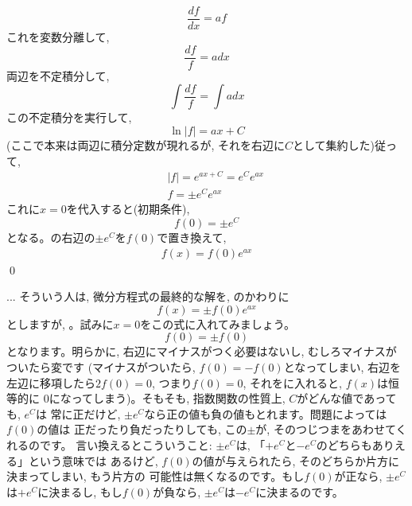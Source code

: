 \begin{equation}\frac{df}{dx}=a f\end{equation}
これを変数分離して, 
\begin{equation}\frac{df}{f}=a dx\end{equation}
両辺を不定積分して, 
\begin{equation}\int\frac {df}{f} = \int a dx\end{equation}
この不定積分を実行して, 
\begin{equation}\ln |f| = a x + C\end{equation}
(ここで本来は両辺に積分定数が現れるが, それを右辺に$C$として集約した)従って, 
\begin{eqnarray}
&&|f| = e^{a x + C} = e^C e^{a x}\\
&&f = \pm e^C e^{a x}\label{eq:1o_diffeq7}
\end{eqnarray}
これに$x=0$を代入すると(初期条件), 
\begin{equation}f(0) = \pm e^C\label{eq:1o_diffeq8}\end{equation}
となる。の右辺の$\pm e^C$を$f(0)$で置き換えて, 
\begin{eqnarray}
f(x)=f(0) e^{a x}\label{eq:1o_diffeq9}
\end{eqnarray}
\qed

\begin{freqmiss}{\small{} ... そういう人は, 微分方程式の最終的な解を, のかわりに
\begin{equation}f(x)=\pm f(0) e^{a x}\label{eq:diff_eq_pm_wrong}\end{equation}
としますが, 。試みに$x=0$をこの式に入れてみましょう。
\begin{equation}f(0)=\pm f(0)\label{eq:diffeq_initcond_pm}\end{equation}
となります。明らかに, 右辺にマイナスがつく必要はないし, むしろマイナスがついたら変です
(マイナスがついたら, $f(0)=-f(0)$となってしまい, 右辺を左辺に移項したら$2f(0)=0$, 
つまり$f(0)=0$, それをに入れると, $f(x)$は恒等的に
0になってしまう)。そもそも, 指数関数の性質上, $C$がどんな値であっても, $e^C$は
常に正だけど, $\pm e^C$なら正の値も負の値もとれます。問題によっては$f(0)$の値は
正だったり負だったりしても, この$\pm$が, そのつじつまをあわせてくれるのです。
言い換えるとこういうこと: $\pm e^C$は, 「$+e^C$と$-e^C$のどちらもありえる」という意味では
あるけど, $f(0)$の値が与えられたら, そのどちらか片方に決まってしまい, もう片方の
可能性は無くなるのです。もし$f(0)$が正なら, $\pm e^C$は$+e^C$に決まるし, 
もし$f(0)$が負なら, $\pm e^C$は$-e^C$に決まるのです。}\end{freqmiss}

